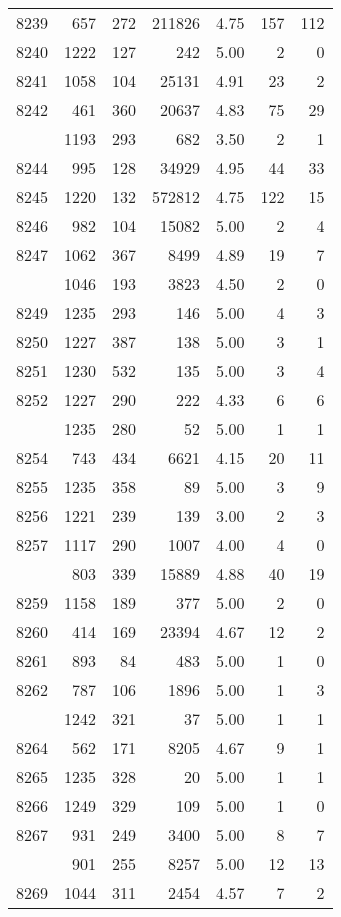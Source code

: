 \documentclass[
]{article}
\begin{document}
\begin{table}
\begin{tabular}[t]{lrrrrrr}
8239 & 657 & 272 & 211826 & 4.75 & 157 & 112\\
8240 & 1222 & 127 & 242 & 5.00 & 2 & 0\\
8241 & 1058 & 104 & 25131 & 4.91 & 23 & 2\\
8242 & 461 & 360 & 20637 & 4.83 & 75 & 29\\
\addlinespace
8243 & 1193 & 293 & 682 & 3.50 & 2 & 1\\
8244 & 995 & 128 & 34929 & 4.95 & 44 & 33\\
8245 & 1220 & 132 & 572812 & 4.75 & 122 & 15\\
8246 & 982 & 104 & 15082 & 5.00 & 2 & 4\\
8247 & 1062 & 367 & 8499 & 4.89 & 19 & 7\\
\addlinespace
8248 & 1046 & 193 & 3823 & 4.50 & 2 & 0\\
8249 & 1235 & 293 & 146 & 5.00 & 4 & 3\\
8250 & 1227 & 387 & 138 & 5.00 & 3 & 1\\
8251 & 1230 & 532 & 135 & 5.00 & 3 & 4\\
8252 & 1227 & 290 & 222 & 4.33 & 6 & 6\\
\addlinespace
8253 & 1235 & 280 & 52 & 5.00 & 1 & 1\\
8254 & 743 & 434 & 6621 & 4.15 & 20 & 11\\
8255 & 1235 & 358 & 89 & 5.00 & 3 & 9\\
8256 & 1221 & 239 & 139 & 3.00 & 2 & 3\\
8257 & 1117 & 290 & 1007 & 4.00 & 4 & 0\\
\addlinespace
8258 & 803 & 339 & 15889 & 4.88 & 40 & 19\\
8259 & 1158 & 189 & 377 & 5.00 & 2 & 0\\
8260 & 414 & 169 & 23394 & 4.67 & 12 & 2\\
8261 & 893 & 84 & 483 & 5.00 & 1 & 0\\
8262 & 787 & 106 & 1896 & 5.00 & 1 & 3\\
\addlinespace
8263 & 1242 & 321 & 37 & 5.00 & 1 & 1\\
8264 & 562 & 171 & 8205 & 4.67 & 9 & 1\\
8265 & 1235 & 328 & 20 & 5.00 & 1 & 1\\
8266 & 1249 & 329 & 109 & 5.00 & 1 & 0\\
8267 & 931 & 249 & 3400 & 5.00 & 8 & 7\\
\addlinespace
8268 & 901 & 255 & 8257 & 5.00 & 12 & 13\\
8269 & 1044 & 311 & 2454 & 4.57 & 7 & 2\\

\end{tabular}
\end{table}
\end{document}
